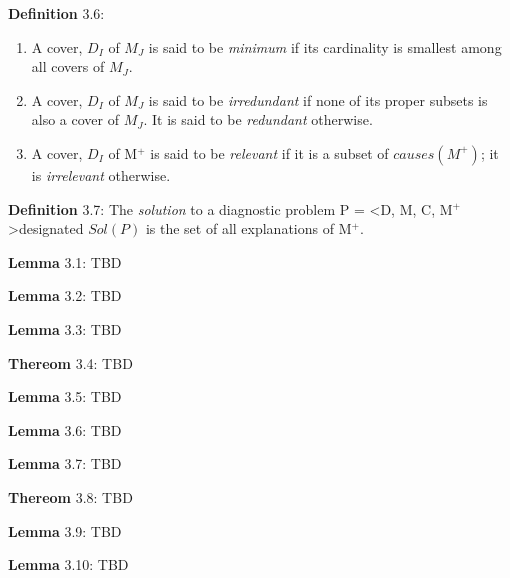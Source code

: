 \documentclass{article}
\begin{document}
\par 
\textbf{Definition} 3.6: 
\begin{enumerate}
\item A cover, $D_I$ of $M_J$ is said to be \textit{minimum}
if its cardinality is smallest among all covers of $M_J$.
\item A cover, $D_I$ of $M_J$ is said to be \textit{irredundant} if none of its
proper subsets is also a cover of $M_J$. It is said to be \textit{redundant}
otherwise.
\item A cover, $D_I$ of M$^{+}$ is said to be \textit{relevant} if it is a
subset of $causes(M^{+})$; it is \textit{irrelevant} otherwise.
\end{enumerate}

\par 
\textbf{Definition} 3.7: The \textit{solution} to a diagnostic problem
P = \textless D, M, C, M$^{+}$\textgreater designated $Sol(P)$ is the set of all
explanations of M$^{+}$.
\newline

\par 
\textbf{Lemma} 3.1: TBD
\newline

\par 
\textbf{Lemma} 3.2: TBD
\newline

\par 
\textbf{Lemma} 3.3: TBD
\newline

\par 
\textbf{Thereom} 3.4: TBD
\newline

\par 
\textbf{Lemma} 3.5: TBD
\newline

\par 
\textbf{Lemma} 3.6: TBD
\newline

\par 
\textbf{Lemma} 3.7: TBD
\newline

\par 
\textbf{Thereom} 3.8: TBD
\newline

\par 
\textbf{Lemma} 3.9: TBD
\newline

\par 
\textbf{Lemma} 3.10: TBD
\newline
\end{document}
